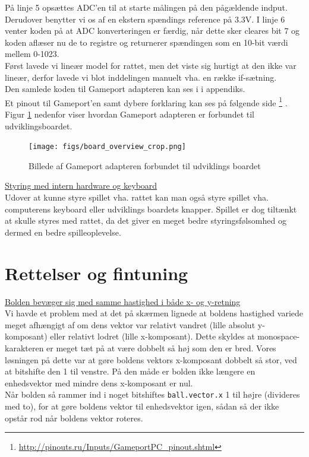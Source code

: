 På linje 5 opsættes ADC'en til at starte målingen på den pågældende indput. Derudover benytter vi os af en ekstern spændings reference på 3.3V. I linje 6 venter koden på at ADC konverteringen er færdig, når dette sker cleares bit 7 og koden aflæser nu de to registre og returnerer spændingen som en 10-bit værdi mellem 0-1023.\\
Først lavede vi lineær model for rattet, men det viste sig hurtigt at den ikke var lineær, derfor lavede vi blot inddelingen manuelt vha. en række if-sætning.\\

Den samlede koden til Gameport adapteren kan ses i  i appendiks.\\

Et pinout til Gameport'en samt dybere forklaring kan ses på følgende side \footnote{\url{http://pinouts.ru/Inputs/GameportPC_pinout.shtml}} .\\

Figur \ref{fig:board_overview} nedenfor viser hvordan Gameport adapteren er forbundet til udviklingsboardet.

\begin{figure}[h!]
\centering
\texttt{[image: figs/board\_overview\_crop.png]}
\caption{Billede af Gameport adapteren forbundet til udviklings boardet}
\label{fig:board_overview}
\end{figure}
\newpage

\underline{Styring med intern hardware og keyboard}\\

Udover at kunne styre spillet vha. rattet kan man også styre spillet vha. computerens keyboard eller udviklings boardets knapper. Spillet er dog tiltænkt at skulle styres med rattet, da det giver en meget bedre styringsfølsomhed og dermed en bedre spilleoplevelse.\\

\section{Rettelser og fintuning}


\underline{Bolden bevæger sig med samme hastighed i både x- og y-retning}\\

Vi havde et problem med at det på skærmen lignede at boldens hastighed variede meget afhængigt af om dens vektor var relativt vandret (lille absolut y-komposant) eller relativt lodret (lille x-komposant). Dette skyldes at monospace-karakteren er meget tæt på at være dobbelt så høj som den er bred. Vores løsningen på dette var at gøre boldens vektors x-komposant dobbelt så stor, ved at bitshifte den 1 til venstre. På den måde er bolden ikke længere en enhedsvektor med mindre dens x-komposant er nul.\\
Når bolden så rammer ind i noget bitshiftes \texttt{ball.vector.x} 1 til højre (divideres med to), for at gøre boldens vektor til enhedsvektor igen, sådan så der ikke opstår rod når boldens vektor roteres.\\

